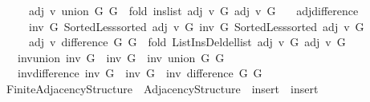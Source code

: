 \begin{isabellebody}
\ \ \ \ \ adj\ v\ {\isacharparenleft}{\kern0pt}union\ G{}\ G{}{\isacharparenright}{\kern0pt}\ {\isacharequal}{\kern0pt}\ fold\ ins{\isacharunderscore}{\kern0pt}list\ {\isacharparenleft}{\kern0pt}adj\ v\ G{}{\isacharparenright}{\kern0pt}\ {\isacharparenleft}{\kern0pt}adj\ v\ G{}{\isacharparenright}{\kern0pt}{\isachardoublequoteclose}\isanewline
\ \ \ adj{\isacharunderscore}{\kern0pt}difference{\isacharcolon}{\kern0pt}\isanewline
\ \ \ \ {\isachardoublequoteopen}{\isasymlbrakk}\ inv\ G{}{\isacharsemicolon}{\kern0pt}\ Sorted{\isacharunderscore}{\kern0pt}Less{\isachardot}{\kern0pt}sorted\ {\isacharparenleft}{\kern0pt}adj\ v\ G{}{\isacharparenright}{\kern0pt}{\isacharsemicolon}{\kern0pt}\ inv\ G{}{\isacharsemicolon}{\kern0pt}\ Sorted{\isacharunderscore}{\kern0pt}Less{\isachardot}{\kern0pt}sorted\ {\isacharparenleft}{\kern0pt}adj\ v\ G{}{\isacharparenright}{\kern0pt}\ {\isasymrbrakk}\ {\isasymLongrightarrow}\isanewline
\ \ \ \ \ adj\ v\ {\isacharparenleft}{\kern0pt}difference\ G{}\ G{}{\isacharparenright}{\kern0pt}\ {\isacharequal}{\kern0pt}\ fold\ List{\isacharunderscore}{\kern0pt}Ins{\isacharunderscore}{\kern0pt}Del{\isachardot}{\kern0pt}del{\isacharunderscore}{\kern0pt}list\ {\isacharparenleft}{\kern0pt}adj\ v\ G{}{\isacharparenright}{\kern0pt}\ {\isacharparenleft}{\kern0pt}adj\ v\ G{}{\isacharparenright}{\kern0pt}{\isachardoublequoteclose}\isanewline
\ \ \ inv{\isacharunderscore}{\kern0pt}union{\isacharcolon}{\kern0pt}\ {\isachardoublequoteopen}inv\ G{}\ {\isasymLongrightarrow}\ inv\ G{}\ {\isasymLongrightarrow}\ inv\ {\isacharparenleft}{\kern0pt}union\ G{}\ G{}{\isacharparenright}{\kern0pt}{\isachardoublequoteclose}\isanewline
\ \ \ inv{\isacharunderscore}{\kern0pt}difference{\isacharcolon}{\kern0pt}\ {\isachardoublequoteopen}inv\ G{}\ {\isasymLongrightarrow}\ inv\ G{}\ {\isasymLongrightarrow}\ inv\ {\isacharparenleft}{\kern0pt}difference\ G{}\ G{}{\isacharparenright}{\kern0pt}{\isachardoublequoteclose}\isanewline
\isanewline
{}\isamarkupfalse%
\ Finite{\isacharunderscore}{\kern0pt}Adjacency{\isacharunderscore}{\kern0pt}Structure{\isacharunderscore}{\kern0pt}{}\ {\isacharequal}{\kern0pt}\ Adjacency{\isacharunderscore}{\kern0pt}Structure{\isacharunderscore}{\kern0pt}{}\ \ insert\ {\isacharequal}{\kern0pt}\ insert\ \isanewline

\end{isabellebody}
